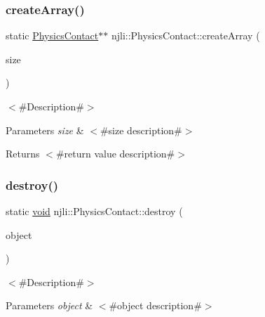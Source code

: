 \subsubsection{\texorpdfstring{create\+Array()}{createArray()}}
{\footnotesize\ttfamily static \mbox{\hyperlink{classnjli_1_1_physics_contact}{Physics\+Contact}}$\ast$$\ast$ njli\+::\+Physics\+Contact\+::create\+Array (\begin{DoxyParamCaption}\item[{const \mbox{\hyperlink{_util_8h_a10e94b422ef0c20dcdec20d31a1f5049}{u32}}}]{size }\end{DoxyParamCaption})\hspace{0.3cm}{\ttfamily [static]}}

$<$\#\+Description\#$>$


\begin{DoxyParams}{Parameters}
{\em size} & $<$\#size description\#$>$\\
\hline
\end{DoxyParams}
\begin{DoxyReturn}{Returns}
$<$\#return value description\#$>$ 
\end{DoxyReturn}
\mbox{\label{classnjli_1_1_physics_contact_a6e13c908bef23f175dc20d5e5a23d25b}} 
\subsubsection{\texorpdfstring{destroy()}{destroy()}}
{\footnotesize\ttfamily static \mbox{\hyperlink{_thread_8h_af1e856da2e658414cb2456cb6f7ebc66}{void}} njli\+::\+Physics\+Contact\+::destroy (\begin{DoxyParamCaption}\item[{\mbox{\hyperlink{classnjli_1_1_physics_contact}{Physics\+Contact}} $\ast$}]{object }\end{DoxyParamCaption})\hspace{0.3cm}{\ttfamily [static]}}

$<$\#\+Description\#$>$


\begin{DoxyParams}{Parameters}
{\em object} & $<$\#object description\#$>$ \\
\hline
\end{DoxyParams}
\mbox{\label{classnjli_1_1_physics_contact_a5c77ba3e3647f5e71ff0332b6960a5cc}} 
